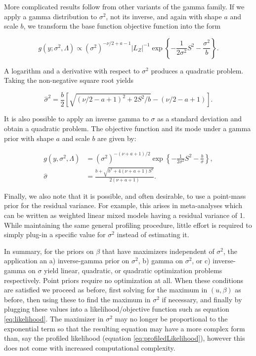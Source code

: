 \documentclass[article,shortnames]{jss}
\begin{document}
More complicated results follow from other variants of the gamma
family. If we apply a gamma distribution to $\sigma^2$, not its
inverse, and again with shape $a$ and scale $b$, we transform the base
function objective function into the form

\begin{equation*}
  g(y; \sigma^2, \Lambda) \propto(\sigma^2)^{-\nu/2 + a -
    1}|L_Z|^{-1}\exp\left\{-\frac{1}{2\sigma^2}S^2 - \frac{\sigma^2}{b}\right\}.
\end{equation*}

A logarithm and a derivative with respect to $\sigma^2$ produces a
quadratic problem. Taking the non-negative square root yields

\begin{equation*}
  \hat{\sigma}^2 = \frac{b}{2}\left[ \sqrt{(\nu/2 - a + 1)^2 + 2 S^2 /
      b} - (\nu / 2 - a + 1)\right].
\end{equation*}

It is also possible to apply an inverse gamma to $\sigma$ as
a standard deviation and obtain a quadratic problem. The objective
function and its mode under a gamma prior with shape $a$ and scale $b$
are given by:

\begin{align*}
  g(y, \sigma^2, \Lambda) & = (\sigma^2)^{-(\nu + a + 1)/2}
  \exp\left\{-\frac{1}{2\sigma^2}S^2 - \frac{b}{\sigma}\right\}, \\
  \hat\sigma & = \frac{b + \sqrt{b^2 + 4(\nu + a + 1)S^2}}{2(\nu + a + 1)}.
\end{align*}

Finally, we also note that it is possible, and often desirable, to use
a point-mass prior for the residual variance. For example, this arises in
meta-analyses which can be written as weighted linear mixed models
having a residual variance of 1. While maintaining the same general
profiling procedure, little effort is
required to simply plug-in a specific value for $\sigma^2$ instead of
estimating it.

In summary, for the priors on $\beta$ that have maximizers independent
of $\sigma^2$, the application an a) inverse-gamma prior on
$\sigma^2$, b) gamma on $\sigma^2$, or c) inverse-gamma on $\sigma$
yield linear, quadratic, or quadratic optimization problems
respectively. Point priors require no optimization at all. When these conditions are satisfied
we proceed as before, first solving for the maximum in $(u, \beta)$ as before, then using these
to find the maximum in $\sigma^2$ if necessary, and finally by plugging these values into a
likelihood/objective function such as equation \ref{eq:likelihood}. The maximizer in $\sigma^2$ may no longer
be proportional to the exponential term so that the resulting equation may have a more
complex form than, say the profiled likelihood (equation \ref{eq:profiledLikelihood}),
however this does not come with increased computational complexity.
\end{document}
